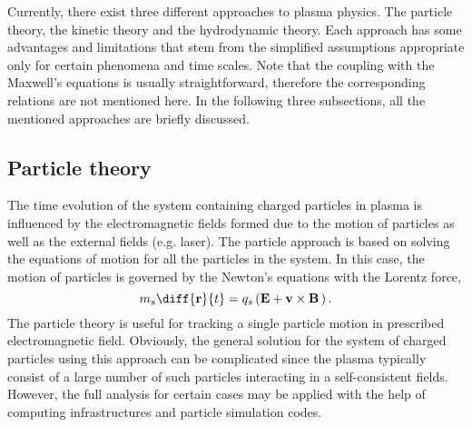 Currently, there exist three different approaches to plasma physics. The particle theory, the kinetic theory and the hydrodynamic theory. Each approach has some advantages and limitations that stem from the simplified assumptions appropriate only for certain phenomena and time scales. Note that the coupling with the Maxwell's equations is usually straightforward, therefore the corresponding relations are not mentioned here. In the following three subsections, all the mentioned approaches are briefly discussed. 

\subsection{Particle theory}
The time evolution of the system containing charged particles in plasma is influenced by the electromagnetic fields formed due to the motion of particles as well as the external fields (e.g. laser). The particle approach is based on solving the equations of motion for all the particles in the system. In this case, the motion of particles is governed by the Newton's equations with the Lorentz force,
\begin{equation}
\label{2.2.5}
m_s \diff{\vec{r}}{t} = q_s \left(\vec{E} + \vec{v} \times \vec{B} \, \right).
\end{equation}
The particle theory is useful for tracking a single particle motion in prescribed electromagnetic field. Obviously, the general solution for the system of charged particles using this approach can be complicated since the plasma typically consist of a large number of such particles interacting in a self-consistent fields. However, the full analysis for certain cases may be applied with the help of computing infrastructures and particle simulation codes.

